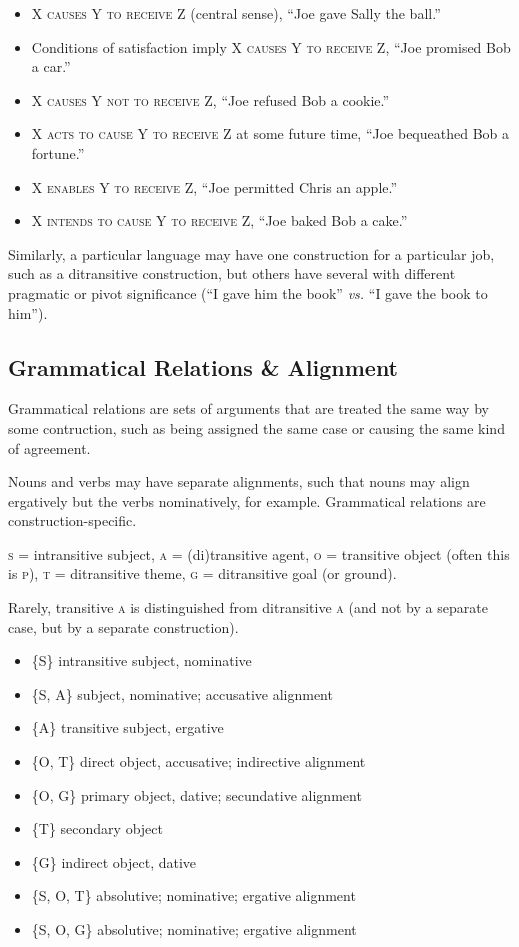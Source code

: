 \documentclass[11pt]{article}
\newcommand{\I}[1]{\textsc{#1}}   %
\newenvironment{grammarlist}%
 {\begin{itemize}\addtolength{\itemsep}{-0.5\baselineskip}\ignorespaces}%
 {\end{itemize}\ignorespacesafterend}
\begin{document}
{\begin{grammarlist}
  \item \I{X causes Y to receive Z} (central sense), ``Joe gave Sally
    the ball.''
  \item Conditions of satisfaction imply \I{X causes Y to receive Z},
    ``Joe promised Bob a car.''
  \item \I{X causes Y not to receive Z}, ``Joe refused Bob a cookie.''
  \item \I{X acts to cause Y to receive Z} at some future time, ``Joe
    bequeathed Bob a fortune.''
  \item \I{X enables Y to receive Z}, ``Joe permitted Chris an
    apple.''
  \item \I{X intends to cause Y to receive Z}, ``Joe baked Bob a cake.''
\end{grammarlist}

Similarly, a particular language may have one construction for a
particular job, such as a ditransitive construction, but others have
several with different pragmatic or pivot significance (``I gave him
the book'' \textit{vs.} ``I gave the book to him'').


\subsection{Grammatical Relations \& Alignment}
Grammatical relations are sets of arguments that are treated the same
way by some contruction, such as being assigned the same case or
causing the same kind of agreement.

Nouns and verbs may have separate alignments, such that nouns may
align ergatively but the verbs nominatively, for example.  Grammatical
relations are construction-specific.

\I{s} = intransitive subject, \I{a} = (di)transitive agent, \I{o} =
transitive object (often this is \I{p}), \I{t} = ditransitive theme,
\I{g} = ditransitive goal (or ground).

Rarely, transitive \I{a} is distinguished from ditransitive \I{a} (and
not by a separate case, but by a separate construction).

\begin{grammarlist}
  \item \{\I{S}\} intransitive subject, nominative
  \item \{\I{S, A}\} subject, nominative; accusative alignment
  \item \{\I{A}\} transitive subject, ergative
  \item \{\I{O, T}\} direct object, accusative; indirective alignment
  \item \{\I{O, G}\} primary object, dative; secundative alignment
  \item \{\I{T}\} secondary object
  \item \{\I{G}\} indirect object, dative
  \item \{\I{S, O, T}\} absolutive; nominative; ergative alignment
  \item \{\I{S, O, G}\} absolutive; nominative; ergative alignment
\end{grammarlist}

}
\end{document}
